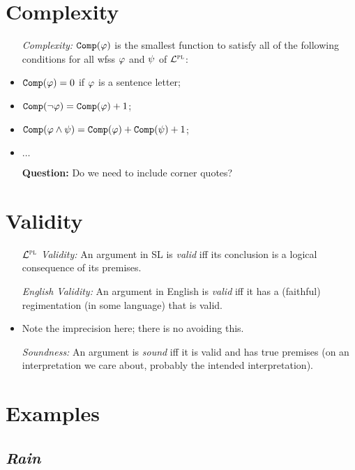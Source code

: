 \documentclass[a4paper, 11pt]{article} %
\begin{document}
\section*{Complexity}

\begin{itemize}[leftmargin=1.5in,labelsep=.15in] %
  \item[\it Complexity:] $\texttt{Comp}(\varphi)$ is the smallest function to satisfy all of the following conditions for all wfss $\varphi$ and $\psi$ of $\mathcal{L}^{\textsc{pl}}$: 
    \item $\texttt{Comp}(\varphi) = 0$ if $\varphi$ is a sentence letter; 
    \item $\texttt{Comp}(\neg\varphi) = \texttt{Comp}(\varphi) + 1$; 
    \item $\texttt{Comp}(\varphi \wedge \psi) = \texttt{Comp}(\varphi) + \texttt{Comp}(\psi) + 1$; 
    \item $\ldots$
  \item[\bf Question:] Do we need to include corner quotes?
\end{itemize}




\section*{Validity}

\begin{itemize}[leftmargin=1.2in,labelsep=.15in] %
  \item[\it $\mathcal{L}^{\textsc{pl}}$ Validity:] An argument in SL is \textit{valid} iff its conclusion is a logical consequence of its premises.
  \item[\it English Validity:] An argument in English is \textit{valid} iff it has a (faithful) regimentation (in some language) that is valid.
    \item Note the imprecision here; there is no avoiding this.
  \item[\it Soundness:] An argument is \textit{sound} iff it is valid and has true premises (on an interpretation we care about, probably the intended interpretation).
\end{itemize}





\section*{Examples}


\subsection*{\it \textbf{Rain}}
\end{document}
